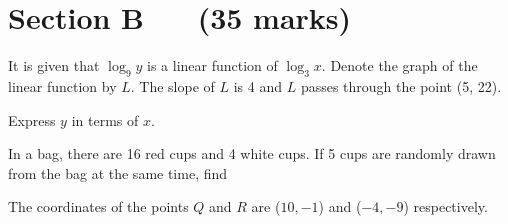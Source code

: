 \documentclass[11pt,paper=a4,answers]{exam}
\begin{document}
\newpage
\section*{Section B ~~ (35 marks)}
    \marksnotpoints
\begin{questions}
    \setcounter{question}{14}

    \label{2024-I-15: Log graph}
    \question[3]
        It is given that $\displaystyle \log_{9}y$ is a linear function of $\displaystyle \log_{3}x$. Denote the graph of the linear function by $L$.
        The slope of $L$ is 4 and $L$ passes through the point (5, 22).
        
        \vspace{0.2cm}
        Express $y$ in terms of $x$. \droppoints

    \vspace{0.5cm}
    \label{2024-I-16: Permutation and combination}
    \question
        In a bag, there are 16 red cups and 4 white cups. If 5 cups are randomly drawn from the bag at the same time, find

    \vspace{0.5cm}
    \label{2024-I-17: Locus and circle}
    \question
        The coordinates of the points $Q$ and $R$ are ($10, -1$) and ($-4, -9$) respectively.
\end{questions}
\end{document}
